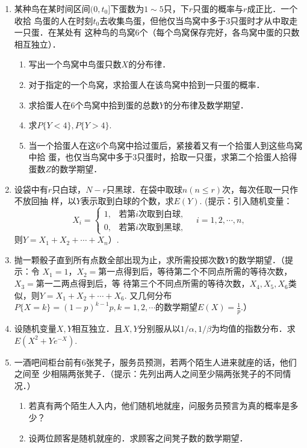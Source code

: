 \documentclass[10pt,a4paper]{article}
\begin{document}
\begin{enumerate}
    \item 某种鸟在某时间区间$(0,t_0]$下蛋数为$1\sim 5$只，下$r$只蛋的概率与$r$成正比．一个收拾
    鸟蛋的人在时刻$t_0$去收集鸟蛋，但他仅当鸟窝中多于3只蛋时才从中取走一只蛋．在某处有
    这种鸟的鸟窝6个（每个鸟窝保存完好，各鸟窝中蛋的只数相互独立）．
    \begin{enumerate}
        \item 写出一个鸟窝中鸟蛋只数$X$的分布律．
        \item 对于指定的一个鸟窝，求拾蛋人在该鸟窝中拾到一只蛋的概率．
        \item 求拾蛋人在6个鸟窝中拾到蛋的总数$Y$的分布律及数学期望．
        \item 求$P\{Y<4\},P\{Y>4\}$.
        \item 当一个拾蛋人在这6个鸟窝中拾过蛋后，紧接着又有一个拾蛋人到这些鸟窝中拾
        蛋，也仅当鸟窝中多于3只蛋时，拾取一只蛋，求第二个拾蛋人拾得蛋数$Z$的数学期望．
    \end{enumerate}
    \clearpage



    \item 设袋中有$r$只白球，$N-r$只黑球．在袋中取球$n(n\leq r)$次，每次任取一只作不放回抽
    样，以$Y$表示取到白球的个数，求$E(Y)$. (提示：引入随机变量：
    $$X_i=\left\{\begin{array}{ll}
        1, & \mbox{若第}i\mbox{次取到白球},\\
        0, & \mbox{若第}i\mbox{次取到黑球},
    \end{array}\right.\quad
    i=1,2,\cdots,n,$$
    则$Y=X_1+X_2+\cdots+X_n$）.
    \clearpage


    \item 抛一颗骰子直到所有点数全部出现为止，求所需投掷次数$Y$的数学期望．（提示：令
    $X_1=1$，$X_2=$第一点得到后，等待第二个不同点所需的等待次数， $X_3=$第一二两点得到后，等
    待第三个不同点所需的等待次数，$X_4,X_5,X_6$类似，则$Y=X_1+X_2+\cdots+X_6$. 又几何分布
    $P\{X=k\}=(1-p)^{k-1}p,k=1,2,\cdots$的数学期望$E(X)=\frac{1}{p}$.）
    \clearpage


    \item 设随机变量$X,Y$相互独立．且$X,Y$分别服从以$1/\alpha,1/\beta$为均值的指数分布．求
    $E(X^2+Ye^{-X})$.
    \clearpage




    \item 一酒吧间柜台前有6张凳子，服务员预测，若两个陌生人进来就座的话，他们之间至
    少相隔两张凳子．（提示：先列出两人之间至少隔两张凳子的不同情况．）
    \begin{enumerate}
        \item 若真有两个陌生人入内，他们随机地就座，问服务员预言为真的概率是多少？
        \item 设两位顾客是随机就座的．求顾客之间凳子数的数学期望．
    \end{enumerate}
    \clearpage




\end{enumerate}
\end{document}
